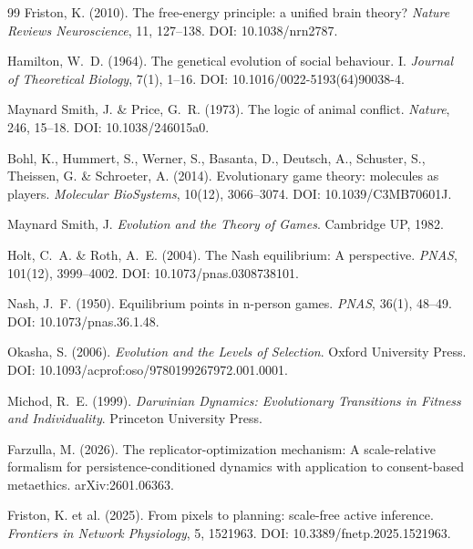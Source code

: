 \documentclass[12pt,a4paper]{article}
\theoremstyle{remark}
\begin{document}
\begin{thebibliography}{99}
Friston, K. (2010).
\newblock The free-energy principle: a unified brain theory?
\newblock \textit{Nature Reviews Neuroscience}, 11, 127--138.
\newblock DOI: 10.1038/nrn2787.

Hamilton, W.~D. (1964).
\newblock The genetical evolution of social behaviour. I.
\newblock \textit{Journal of Theoretical Biology}, 7(1), 1--16.
\newblock DOI: 10.1016/0022-5193(64)90038-4.

Maynard Smith, J. \& Price, G.~R. (1973).
\newblock The logic of animal conflict.
\newblock \textit{Nature}, 246, 15--18.
\newblock DOI: 10.1038/246015a0.

Bohl, K., Hummert, S., Werner, S., Basanta, D., Deutsch, A., Schuster, S., Theissen, G. \& Schroeter, A. (2014).
\newblock Evolutionary game theory: molecules as players.
\newblock \textit{Molecular BioSystems}, 10(12), 3066--3074.
\newblock DOI: 10.1039/C3MB70601J.

Maynard Smith, J.
\newblock \textit{Evolution and the Theory of Games}.
\newblock Cambridge UP, 1982.

Holt, C.~A. \& Roth, A.~E. (2004).
\newblock The Nash equilibrium: A perspective.
\newblock \textit{PNAS}, 101(12), 3999--4002.
\newblock DOI: 10.1073/pnas.0308738101.

Nash, J.~F. (1950).
\newblock Equilibrium points in n-person games.
\newblock \textit{PNAS}, 36(1), 48--49.
\newblock DOI: 10.1073/pnas.36.1.48.

Okasha, S. (2006).
\newblock \textit{Evolution and the Levels of Selection}.
\newblock Oxford University Press.
\newblock DOI: 10.1093/acprof:oso/9780199267972.001.0001.

Michod, R.~E. (1999).
\newblock \textit{Darwinian Dynamics: Evolutionary Transitions in Fitness and Individuality}.
\newblock Princeton University Press.

Farzulla, M. (2026).
\newblock The replicator-optimization mechanism: A scale-relative formalism for persistence-conditioned dynamics with application to consent-based metaethics.
\newblock arXiv:2601.06363.

Friston, K. et al. (2025).
\newblock From pixels to planning: scale-free active inference.
\newblock \textit{Frontiers in Network Physiology}, 5, 1521963.
\newblock DOI: 10.3389/fnetp.2025.1521963.


\end{thebibliography}
\end{document}
